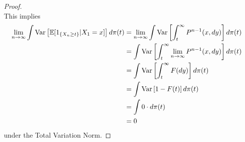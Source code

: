 \begin{theorem}
\begin{proof}
\begin{equation*}
        \end{equation*}
        This implies
        \begin{align*}
            \lim_{n \rightarrow \infty} \int \text{Var}\left[{{\mathbb{E}[1_{\{X_{n} \geq t\}}|X_1=x]}}\right] d\pi(t) &= \lim_{n \rightarrow \infty} \int \text{Var}\left[{{\int_t^{\infty} P^{n-1}(x, dy)}}\right] d\pi(t)\\
            &= \int \text{Var}\left[{{\int_t^{\infty} \lim_{n \rightarrow \infty} P^{n-1}(x, dy)}}\right] d\pi(t)\\
            &= \int \text{Var}\left[{{\int_t^{\infty} F(dy)}}\right] d\pi(t)\\
            &= \int \text{Var}\left[{{1-F(t)}}\right] d\pi(t)\\
            &= \int 0 \cdot d\pi(t)\\
            &= 0
        \end{align*}
        under the Total Variation Norm.
    \end{proof}
\end{theorem}
